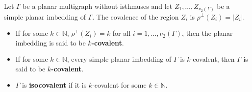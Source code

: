 Let $\Gamma$ be a planar multigraph without isthmuses and let $Z_1, \ldots, Z_{\nu_2(\Gamma)}$ be a simple planar imbedding of $\Gamma$. The covalence of the region $Z_i$ is $\rho^{\perp}(Z_i) = |Z_i|$.

\begin{itemize}
\item If for some $k \in \mathbb{N}$, $\rho^{\perp}(Z_i) = k$ for all $i = 1, \ldots, \nu_2(\Gamma)$, then the planar imbedding is said to be \textbf{$k$-covalent}.
\item If for some $k \in \mathbb{N}$, every simple planar imbedding of $\Gamma$ is $k$-covalent, then $\Gamma$ is said to be \textbf{$k$-covalent}.
\item $\Gamma$ is \textbf{isocovalent} if it is $k$-covalent for some $k \in \mathbb{N}$.
\end{itemize}
